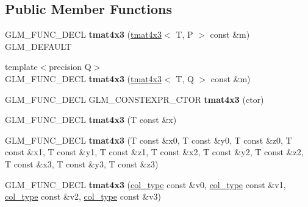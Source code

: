 \subsection*{Public Member Functions}
\begin{DoxyCompactItemize}
\item 
\mbox{\label{structglm_1_1tmat4x3_a5741733ec73d12a93fd1088965fb0523}} 
G\+L\+M\+\_\+\+F\+U\+N\+C\+\_\+\+D\+E\+CL {\bfseries tmat4x3} (\hyperlink{structglm_1_1tmat4x3}{tmat4x3}$<$ T, P $>$ const \&m) G\+L\+M\+\_\+\+D\+E\+F\+A\+U\+LT
\item 
\mbox{\label{structglm_1_1tmat4x3_a1dadd893a6f4303c828c1703c01b6a82}} 
{\footnotesize template$<$precision Q$>$ }\\G\+L\+M\+\_\+\+F\+U\+N\+C\+\_\+\+D\+E\+CL {\bfseries tmat4x3} (\hyperlink{structglm_1_1tmat4x3}{tmat4x3}$<$ T, Q $>$ const \&m)
\item 
\mbox{\label{structglm_1_1tmat4x3_a8311c825e665728b311c89b517672965}} 
G\+L\+M\+\_\+\+F\+U\+N\+C\+\_\+\+D\+E\+CL G\+L\+M\+\_\+\+C\+O\+N\+S\+T\+E\+X\+P\+R\+\_\+\+C\+T\+OR {\bfseries tmat4x3} (ctor)
\item 
\mbox{\label{structglm_1_1tmat4x3_ac334fddfc2ee55301365a3dba5919e06}} 
G\+L\+M\+\_\+\+F\+U\+N\+C\+\_\+\+D\+E\+CL {\bfseries tmat4x3} (T const \&x)
\item 
\mbox{\label{structglm_1_1tmat4x3_ac85a3693a2bef96d65be77e76c70acdb}} 
G\+L\+M\+\_\+\+F\+U\+N\+C\+\_\+\+D\+E\+CL {\bfseries tmat4x3} (T const \&x0, T const \&y0, T const \&z0, T const \&x1, T const \&y1, T const \&z1, T const \&x2, T const \&y2, T const \&z2, T const \&x3, T const \&y3, T const \&z3)
\item 
\mbox{\label{structglm_1_1tmat4x3_acc604d134635bd3f611a8201cacd79c5}} 
G\+L\+M\+\_\+\+F\+U\+N\+C\+\_\+\+D\+E\+CL {\bfseries tmat4x3} (\hyperlink{structglm_1_1tvec3}{col\+\_\+type} const \&v0, \hyperlink{structglm_1_1tvec3}{col\+\_\+type} const \&v1, \hyperlink{structglm_1_1tvec3}{col\+\_\+type} const \&v2, \hyperlink{structglm_1_1tvec3}{col\+\_\+type} const \&v3)
\item 
\mbox{\label{structglm_1_1tmat4x3_a6374ec605f3a745bec999d9dd6926a8d}} 

\end{DoxyCompactItemize}
